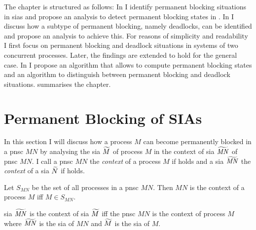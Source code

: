 The chapter is structured as follows:
In \Sect{\ref{sect_block_perm}} I identify permanent blocking situations in \glspl{sia} and propose an analysis to detect permanent blocking states in \Sect{\ref{sect_block_analysis}}.
In \Sect{\ref{sect_block_dl}} I discuss how a subtype of permanent blocking, namely deadlocks, can be identified and propose an analysis to achieve this.
For reasons of simplicity and readability I first focus on permanent blocking and deadlock situations in systems of two concurrent processes.
Later, the findings are extended to hold for the general case.
In \Sect{\ref{sect_block_impl}} I propose an algorithm that allows to compute permanent blocking states and an algorithm to distinguish between permanent blocking and deadlock situations.
\Sect{\ref{sect_block_summary}} summarises the chapter.

\section{Permanent Blocking of SIAs}
\label{sect_block_perm}
In this section I will discuss how a process $M$ can become permanently blocked in a \gls{pnsc} $\mathit{MN}$ by analysing the \gls{sia} $\widetilde{M}$ of process $M$ in the context of \gls{sia} $\widetilde{\mathit{MN}}$ of \gls{pnsc} $\mathit{MN}$.
I call a \gls{pnsc} $\mathit{MN}$ the \emph{context} of a process $M$ if \Def{\ref{def_context_process}} holds and a \gls{sia} $\widetilde{\mathit{MN}}$ the \emph{context} of a \gls{sia} $\widetilde{N}$ if \Def{\ref{def_context_sia}} holds.
\begin{definition}
    \label{def_context_process}
    Let $S_{\mathit{MN}}$ be the set of all processes in a \gls{pnsc} $\mathit{MN}$.
    Then $\mathit{MN}$ is the context of a process $M$ iff $M \in S_{\mathit{MN}}$.
\end{definition}
\begin{definition}
    \label{def_context_sia}
    \Gls{sia} $\widetilde{\mathit{MN}}$ is the context of \gls{sia} $\widetilde{M}$ iff the \gls{pnsc} $\mathit{MN}$ is the context of process $M$ where $\widetilde{\mathit{MN}}$ is the \gls{sia} of $\mathit{MN}$ and $\widetilde{M}$ is the \gls{sia} of $M$.
\end{definition}

